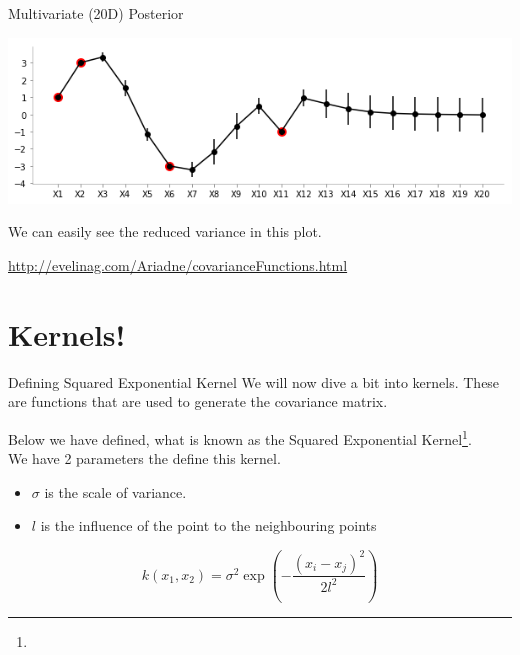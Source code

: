 \documentclass{beamer}
\begin{document}
\begin{frame}{Multivariate (20D) Posterior}
	\begin{center}
		\includegraphics[width=\linewidth, height=\textheight -120pt ,keepaspectratio]{gp/20dcov} \\
	\end{center}
	We can easily see the reduced variance in this plot.
\end{frame}

\urldef\urlsek\url{http://evelinag.com/Ariadne/covarianceFunctions.html}
\section{Kernels!}
\begin{frame}{Defining Squared Exponential Kernel}
	We will now dive a bit into kernels. These are functions that are used to generate the covariance matrix.
	
	Below we have defined, what is known as the Squared Exponential Kernel\footnote{\urlsek}. \\
	
	We have 2 parameters the define this kernel.
	\begin{itemize}
		\item $\sigma$ is the scale of variance.
		\item $l$ is the influence of the point to the neighbouring points
	\end{itemize}

	$$
	k(x_1, x_2) = \sigma^2 \exp\left(-\frac{(x_i - x_j)^2}{2l^2}\right)
	$$
\end{frame}
\end{document}
